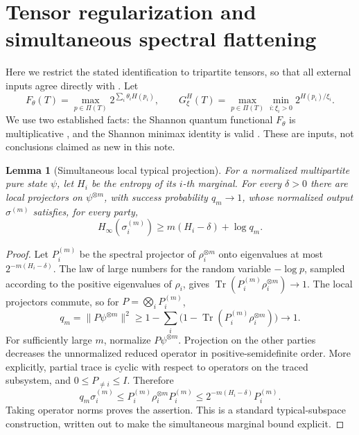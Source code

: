 \documentclass[11pt,a4paper]{article}
\newtheorem{lemma}[theorem]{Lemma}
\newcommand{\Tr}{\operatorname{Tr}}
\newcommand{\Hinf}{H_{\infty}}
\begin{document}
\section{Tensor regularization and simultaneous spectral flattening}
Here we restrict the stated identification to tripartite tensors,
so that all external inputs agree directly with \cite{CLZ,CVZ}.
Let
\[
 F_\theta(T)=\max_{p\in\Pi(T)}2^{\sum_i\theta_iH(p_i)},\qquad
 G_\xi^{H}(T)=\max_{p\in\Pi(T)}\min_{i:\xi_i>0}2^{H(p_i)/\xi_i}.
\]
We use two established facts: the Shannon quantum functional
\(F_\theta\) is multiplicative \cite{CVZ}, and the Shannon minimax
identity is valid \cite{CLZ}. These are inputs, not conclusions
claimed as new in this note.

\begin{lemma}[Simultaneous local typical projection]\label{lem:typical}
For a normalized multipartite pure state \(\psi\), let \(H_i\)
be the entropy of its \(i\)-th marginal. For every \(\delta>0\)
there are local projectors on \(\psi^{\otimes m}\), with success
probability \(q_m\to1\), whose normalized output \(\sigma^{(m)}\)
satisfies, for every party,
\[
 \Hinf(\sigma_i^{(m)})\ge m(H_i-\delta)+\log q_m.
 \label{eq:flatten}
\]
\end{lemma}
\begin{proof}
Let \(P_i^{(m)}\) be the spectral projector of \(\rho_i^{\otimes m}\)
onto eigenvalues at most \(2^{-m(H_i-\delta)}\).
The law of large numbers for the random variable \(-\log p\), sampled
according to the positive eigenvalues of \(\rho_i\), gives
\(\Tr(P_i^{(m)}\rho_i^{\otimes m})\to1\).
The local projectors commute, so for \(P=\bigotimes_iP_i^{(m)}\),
\[
 q_m=\|P\psi^{\otimes m}\|^2
 \ge1-\sum_i\bigl(1-\Tr(P_i^{(m)}\rho_i^{\otimes m})\bigr)\to1.
\]
For sufficiently large \(m\), normalize \(P\psi^{\otimes m}\).
Projection on the other parties decreases the unnormalized reduced
operator in positive-semidefinite order. More explicitly, partial
trace is cyclic with respect to operators on the traced subsystem,
and \(0\le P_{\ne i}\le I\). Therefore
\[
 q_m\sigma_i^{(m)}
 \le P_i^{(m)}\rho_i^{\otimes m}P_i^{(m)}
 \le 2^{-m(H_i-\delta)}P_i^{(m)}.
\]
Taking operator norms proves the assertion. This is a standard
typical-subspace construction, written out to make the simultaneous
marginal bound explicit.
\end{proof}
\end{document}

